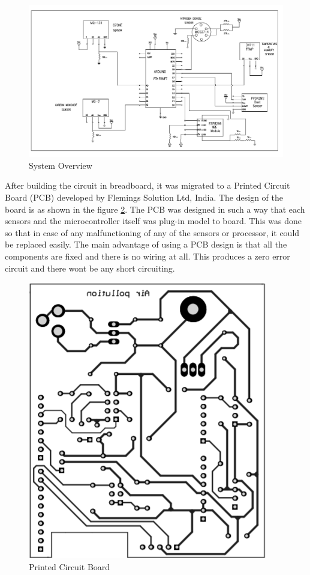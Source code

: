  \begin{figure}[h]
  \begin{center}
  \includegraphics[scale=0.95]{./images/figure5.png}
  \end{center}
  \caption{System Overview}
  \label{system}
\end{figure}

After building the circuit in breadboard, it was migrated to a Printed Circuit Board (PCB) developed by Flemings Solution Ltd, India. The design of the board is as shown in the figure \ref{pcb}. The PCB was designed in such a way that each sensors and the microcontroller itself was plug-in model to board. This was done so that in case of any malfunctioning of any of the sensors or processor, it could be replaced easily. The main advantage of using a PCB design is that all the components are fixed and there is no wiring at all. This produces a zero error circuit and there wont be any short circuiting.



\begin{figure}[h]
  \begin{center}
  \includegraphics[scale=0.50]{./images/figure10.png}
  \end{center}
  \caption{Printed Circuit Board}
  \label{pcb}
\end{figure}

